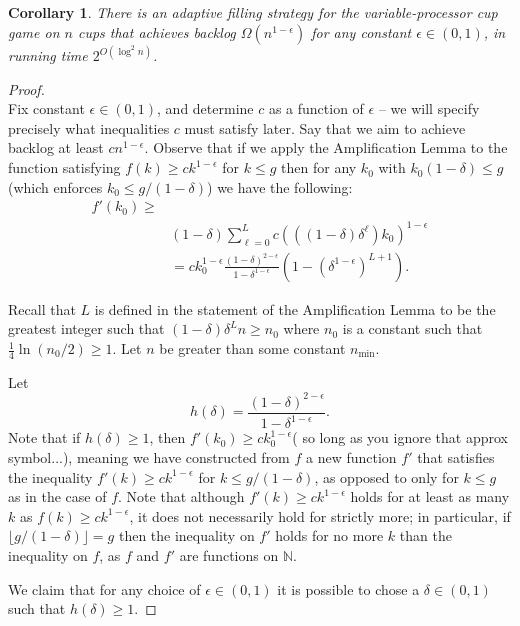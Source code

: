 \documentclass[twocolumn]{article}[11pt]
\newtheorem{corollary}{Corollary}
\begin{document}
\begin{corollary}
  \label{cor:adaptivePoly}
  There is an adaptive filling strategy for the variable-processor cup game on
  $n$ cups that achieves backlog $\Omega(n^{1-\epsilon})$ for any constant
  $\epsilon \in (0,1)$, in running time $2^{O(\log^2 n)}$.
\end{corollary}
\begin{proof}$ $\\
  Fix constant $\epsilon \in (0,1)$, and determine $c$ as a function of
  $\epsilon$ -- we will specify precisely what inequalities $c$ must satisfy
  later. 
  Say that we aim to achieve backlog at least $cn^{1-\epsilon}$.
  Observe that if we apply the Amplification Lemma to the function satisfying
  $f(k) \ge ck^{1-\epsilon}$ for $k \le g$ then for any $k_0$ with
  $k_0(1-\delta)\le g$ (which enforces $k_0 \le g/ (1-\delta)$) we have the
  following:
  \begin{align*}
  f'(k_0)\ge&\\
  &(1-\delta)\sum_{\ell=0}^L c (((1-\delta)\delta^\ell)k_0)^{1-\epsilon}\\
  &= ck_0^{1-\epsilon} \frac{(1-\delta)^{2-\epsilon}}{1-\delta^{1-\epsilon}}(1-(\delta^{1-\epsilon})^{L+1}).
  \end{align*}

  Recall that $L$ is defined in the statement of the Amplification Lemma to be
  the greatest integer such that $(1-\delta)\delta^Ln \ge n_0$ where $n_0$ is a
  constant such that $\frac{1}{4}\ln(n_0/2) \ge 1$.
  Let $n$ be greater than some constant $n_{\min}$.

  Let 
  $$h(\delta) = \frac{(1-\delta)^{2-\epsilon}}{1-\delta^{1-\epsilon}}.$$
  Note that if $h(\delta)\ge 1$, then $f'(k_0) \ge c
  k_0^{1-\epsilon}$({\color{red} so long as you ignore that approx symbol...}),
  meaning we have constructed from $f$ a new function $f'$ that satisfies the inequality
  $f'(k) \ge ck^{1-\epsilon}$ for $k\le g/(1-\delta)$, as opposed to only for
  $k \le g$ as in the case of $f$.
  Note that although $f'(k) \ge ck^{1-\epsilon}$ holds for at least as many $k$
  as $f(k) \ge c k^{1-\epsilon}$, it does not necessarily hold for strictly
  more; in particular, if $\lfloor g/(1-\delta) \rfloor = g$ then the inequality on
  $f'$ holds for no more $k$ than the inequality on $f$, as $f$ and $f'$ are
  functions on $\mathbb{N}$.

  We claim that for any choice of $\epsilon \in (0,1)$ it is possible to chose
  a $\delta \in (0,1)$ such that $h(\delta) \ge 1$.


\end{proof}
\end{document}
